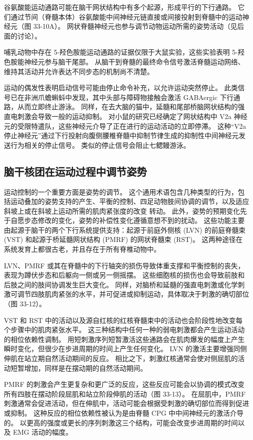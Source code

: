 谷氨酸能运动通路可能在脑干网状结构中有多个起源，形成平行的下行通路。 它们通过节间（脊髓本体）谷氨酸能中间神经元链直接或间接投射到脊髓中的运动神经元（图 33-10A）。 网状脊髓神经元也参与调节动物运动所需的姿势活动（见后面的讨论）。

哺乳动物中存在 5-羟色胺能运动通路的证据仅限于大鼠实验，这些实验表明 5-羟色胺能神经元参与脑干尾部。 从脑干到脊髓的最终命令信号激活脊髓运动网络、维持其活动并允许表达不同步态的机制尚不清楚。

运动的偶发性表明启动信号可能由停止命令补充，以允许运动突然停止。 此类信号已在非洲爪蟾蝌蚪中发现，其中头部与障碍物接触会激活 GABAergic 下行通路，从而立即终止游泳。 同样，在去大脑的猫中，延髓和尾部桥脑网状结构的强直电刺激会导致一般的运动抑制。 对小鼠的研究已经确定了网状结构中 V2a 神经元的受限特遣队，这些神经元介导了正在进行的运动活动的立即停滞。 这种“V2a 停止神经元”通过下行投射向腹侧腰椎脊髓中抑制节律生成的抑制性中间神经元发送行为相关的停止信号。 类似的停止信号会阻止七鳃鳗游泳。

\subsection{脑干核团在运动过程中调节姿势}
运动控制的一个重要方面是姿势的调节。 这个通用术语包含几种类型的行为，包括运动叠加的姿势支持的产生、平衡的控制、四足动物肢间协调的调节，以及适应斜坡上或在斜坡上运动所需的肌肉紧张度的改变 转动。 此外，姿势的预期变化先于自愿步态修改的变化，姿势的补偿性变化遵循意想不到的扰动。 这些功能主要由起源于脑干的两个下行系统提供支持：起源于前庭外侧核 (LVN) 的前庭脊髓束 (VST) 和起源于桥延髓网状结构 (PMRF) 的网状脊髓束 (RST)。 这两种途径在系统发育上都很古老，并且存在于所有脊椎动物中。

LVN、PMRF 或其在脊髓中的下行轴突的损伤导致体重支撑和平衡控制的丧失，表现为蹲伏步态和后躯向一侧或另一侧摇摆。 这些细胞核的损伤也会导致前肢和后肢之间的肢间协调发生巨大变化。 同样，对脑桥和延髓的强直电刺激或化学刺激可调节四肢肌肉紧张的水平，并可促进或抑制运动，具体取决于刺激的确切部位（图 33-12）。

VST 和 RST 中的活动以及源自红核的红核脊髓束中的活动也会阶段性地改变每个步骤中的肌肉紧张水平。 这三种结构中任何一种的弱电刺激都会产生运动活动的相位依赖性调制。 用短刺激序列短暂激活这些通路会在肌肉爆发的幅度上产生瞬时变化，但很少在步进周期的时间上产生任何变化。 LVN 的激活主要增强同侧伸肌在站立期自然活动期间的反应。 相比之下，刺激红核通常会使对侧屈肌的活动短暂增加，同样是在摆动期的自然活动期间。

PMRF 的刺激会产生更复杂和更广泛的反应，这些反应可能会以协调的模式改变所有四肢在摆动阶段屈肌和站立阶段伸肌的活动（图 33-13）。 在屈肌中，PMRF 刺激通常会促进活动，但在伸肌中，活动可能会根据受刺激的确切部位而得到促进或抑制。 这种反应的相位依赖性被认为是由脊髓 CPG 中中间神经元的激活介导的。 以更高的强度或更长的序列刺激这三个结构，可能会改变步进周期的时间以及 EMG 活动的幅度。

